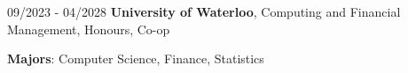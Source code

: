 
\begin{twocolentry}{09/2023 - 04/2028}
    \textbf{University of Waterloo}, Computing and Financial Management, Honours, Co-op
\end{twocolentry}
\begin{onecolentry}
\textbf{Majors}: Computer Science, Finance, Statistics\\
\end{onecolentry}